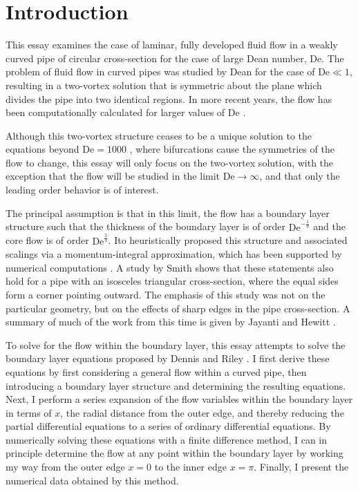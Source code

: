 \documentclass[10pt,a4paper]{report}
\begin{document}
\chapter{Introduction}

This essay examines the case of laminar, fully developed fluid flow in a weakly curved pipe of circular cross-section for the case of large Dean number, $\textrm{De}$. The problem of fluid flow in curved pipes was studied by Dean \cite{dea27} \cite{dea28} for the case of $\textrm{De} \ll 1$, resulting in a two-vortex solution that is symmetric about the plane which divides the pipe into two identical regions. In more recent years, the flow has been computationally calculated for larger values of $\textrm{De}$ \cite{den80} \cite{den82}.

Although this two-vortex structure ceases to be a unique solution to the equations beyond $\textrm{De} = 1000$ \cite{den82}, where bifurcations cause the symmetries of the flow to change, this essay will only focus on the two-vortex solution, with the exception that the flow will be studied in the limit $\textrm{De} \rightarrow \infty$, and that only the leading order behavior is of interest.

The principal assumption is that in this limit, the flow has a boundary layer structure such that the thickness of the boundary layer is of order $\textrm{De}^{-\frac{1}{3}}$ and the core flow is of order $\textrm{De}^{\frac{2}{3}}$. Ito \cite{ito69} heuristically proposed this structure and associated scalings via a momentum-integral approximation, which has been supported by numerical computations \cite{den82}. A study by Smith \cite{smi76} shows that these statements also hold for a pipe with an isosceles triangular cross-section, where the equal sides form a corner pointing outward. The emphasis of this study was not on the particular geometry, but on the effects of sharp edges in the pipe cross-section. A summary of much of the work from this time is given by Jayanti and Hewitt \cite{jay91}.

To solve for the flow within the boundary layer, this essay attempts to solve the boundary layer equations proposed by Dennis and Riley \cite{den91}. I first derive these equations by first considering a general flow within a curved pipe, then introducing a boundary layer structure and determining the resulting equations. Next, I perform a series expansion of the flow variables within the boundary layer in terms of $x$, the radial distance from the outer edge, and thereby reducing the partial differential equations to a series of ordinary differential equations. By numerically solving these equations with a finite difference method, I can in principle determine the flow at any point within the boundary layer by working my way from the outer edge $x=0$ to the inner edge $x=\pi$. Finally, I present the numerical data obtained by this method.
\end{document}
